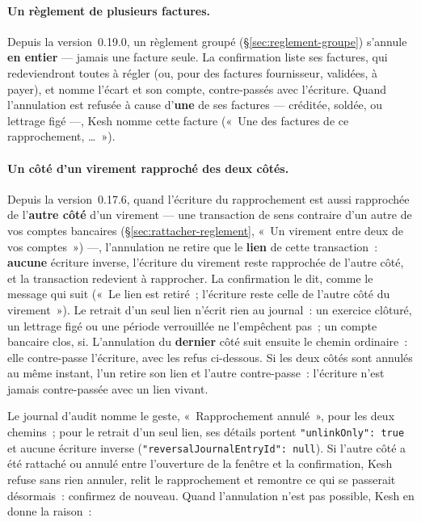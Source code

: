 \documentclass[a4paper,11pt,oneside]{article}
\begin{document}
\paragraph{Un règlement de plusieurs factures.} Depuis la version~0.19.0, un règlement groupé
(\S\ref{sec:reglement-groupe}) s'annule \textbf{en entier} --- jamais une facture seule. La
confirmation liste ses factures, qui redeviendront toutes à régler (ou, pour des factures
fournisseur, validées, à payer), et nomme l'écart et son compte, contre-passés avec l'écriture.
Quand l'annulation est refusée à cause d'\textbf{une} de ses factures --- créditée, soldée, ou
lettrage figé ---, Kesh nomme cette facture («~Une des factures de ce rapprochement, \ldots~»).

\paragraph{Un côté d'un virement rapproché des deux côtés.} Depuis la version~0.17.6, quand
l'écriture du rapprochement est aussi rapprochée de l'\textbf{autre côté} d'un virement --- une
transaction de sens contraire d'un autre de vos comptes bancaires (\S\ref{sec:rattacher-reglement},
«~Un virement entre deux de vos comptes~») ---, l'annulation ne retire que le \textbf{lien} de
cette transaction~: \textbf{aucune} écriture inverse, l'écriture du virement reste rapprochée de
l'autre côté, et la transaction redevient à rapprocher. La confirmation le dit, comme le message
qui suit («~Le lien est retiré~; l'écriture reste celle de l'autre côté du virement~»). Le retrait
d'un seul lien n'écrit rien au journal~: un exercice clôturé, un lettrage figé ou une période
verrouillée ne l'empêchent pas~; un compte bancaire clos, si. L'annulation du \textbf{dernier} côté suit ensuite le chemin
ordinaire~: elle contre-passe l'écriture, avec les refus ci-dessous. Si les deux côtés sont annulés
au même instant, l'un retire son lien et l'autre contre-passe~: l'écriture n'est jamais
contre-passée avec un lien vivant.

Le journal d'audit nomme le geste, «~Rapprochement annulé~», pour les deux chemins~; pour le
retrait d'un seul lien, ses détails portent \texttt{"unlinkOnly": true} et aucune écriture inverse
(\texttt{"reversalJournalEntryId": null}). Si l'autre côté a été rattaché ou annulé entre
l'ouverture de la fenêtre et la confirmation, Kesh refuse sans rien annuler, relit le rapprochement
et remontre ce qui se passerait désormais~: confirmez de nouveau. Quand l'annulation n'est pas
possible, Kesh en donne la raison~:
\end{document}
